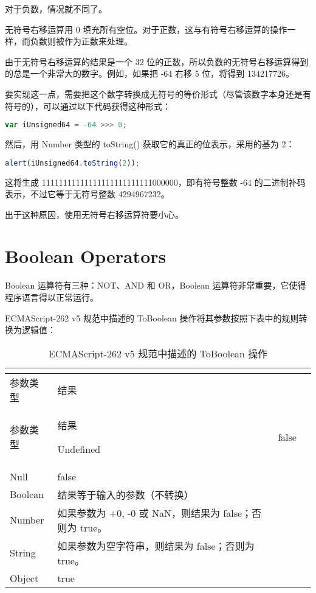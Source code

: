 对于负数，情况就不同了。

无符号右移运算用 0 填充所有空位。对于正数，这与有符号右移运算的操作一样，而负数则被作为正数来处理。

由于无符号右移运算的结果是一个 32 位的正数，所以负数的无符号右移运算得到的总是一个非常大的数字。例如，如果把 -64 右移 5 位，将得到 134217726。

要实现这一点，需要把这个数字转换成无符号的等价形式（尽管该数字本身还是有符号的），可以通过以下代码获得这种形式：

\begin{lstlisting}[language=JavaScript]
var iUnsigned64 = -64 >>> 0;
\end{lstlisting}

然后，用 Number 类型的 toString() 获取它的真正的位表示，采用的基为 2：


\begin{lstlisting}[language=JavaScript]
alert(iUnsigned64.toString(2));
\end{lstlisting}

这将生成 11111111111111111111111111000000，即有符号整数 -64 的二进制补码表示，不过它等于无符号整数 4294967232。

出于这种原因，使用无符号右移运算符要小心。

\chapter{Boolean Operators}


Boolean 运算符有三种：NOT、AND 和 OR，Boolean 运算符非常重要，它使得程序语言得以正常运行。


ECMAScript-262 v5 规范中描述的 ToBoolean 操作将其参数按照下表中的规则转换为逻辑值：

\begin{longtable}{|m{80pt}|m{280pt}|}
\tabularnewline\hline
参数类型	&结果
\endhead

\caption{ECMAScript-262 v5 规范中描述的 ToBoolean 操作}\\
\hline
参数类型	&结果
\endfirsthead

\endfoot


\endlastfoot
\hline
Undefined	&false\\
\hline
Null		&false\\
\hline
Boolean		&结果等于输入的参数（不转换）\\
\hline
Number		&如果参数为 +0, -0 或 NaN，则结果为 false；否则为 true。\\
\hline
String		&如果参数为空字符串，则结果为 false；否则为 true。\\
\hline
Object		&true\\
\hline

\end{longtable}



